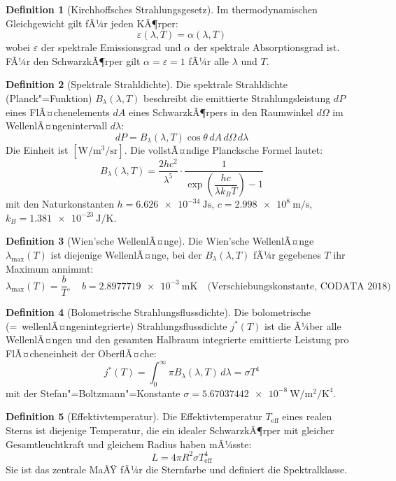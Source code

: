 ﻿\documentclass[a4paper,12pt]{article}
\theoremstyle{definition}
\newtheorem{definition}{Definition}
\begin{document}
\begin{definition}[Kirchhoffsches Strahlungsgesetz]
    Im thermodynamischen Gleichgewicht gilt fÃ¼r jeden KÃ¶rper:
    \[
        \varepsilon(\lambda, T) = \alpha(\lambda, T)
    \]
    wobei $\varepsilon$ der spektrale Emissionsgrad und $\alpha$ der spektrale
    Absorptionsgrad ist. FÃ¼r den SchwarzkÃ¶rper gilt $\alpha = \varepsilon = 1$
    fÃ¼r alle $\lambda$ und $T$.
\end{definition}

\begin{definition}[Spektrale Strahldichte]
    Die spektrale Strahldichte (Planck"=Funktion) $B_\lambda(\lambda, T)$ beschreibt
    die emittierte Strahlungsleistung $dP$ eines FlÃ¤chenelements $dA$ eines
    SchwarzkÃ¶rpers in den Raumwinkel $d\Omega$ im WellenlÃ¤ngenintervall $d\lambda$:
    \[
        dP = B_\lambda(\lambda, T) \cos\theta \, dA \, d\Omega \, d\lambda
    \]
    Die Einheit ist $[\si{\watt\per\metre\cubed\per\steradian}]$. Die vollstÃ¤ndige
    Plancksche Formel lautet:
    \[
        B_\lambda(\lambda, T) = \frac{2hc^2}{\lambda^5} \cdot
        \frac{1}{\exp\!\left(\dfrac{hc}{\lambda k_B T}\right) - 1}
    \]
    mit den Naturkonstanten $h = \SI{6.626e-34}{\joule\second}$,
    $c = \SI{2.998e8}{\metre\per\second}$, $k_B = \SI{1.381e-23}{\joule\per\kelvin}$.
\end{definition}

\begin{definition}[Wien'sche WellenlÃ¤nge]
    Die Wien'sche WellenlÃ¤nge $\lambda_{\max}(T)$ ist diejenige WellenlÃ¤nge,
    bei der $B_\lambda(\lambda,T)$ fÃ¼r gegebenes $T$ ihr Maximum annimmt:
    \[
        \lambda_{\max}(T) = \frac{b}{T}, \quad
        b = \SI{2.8977719e-3}{\metre\kelvin}
        \quad \text{(Verschiebungskonstante, CODATA 2018)}
    \]
\end{definition}

\begin{definition}[Bolometrische Strahlungsflussdichte]
    Die bolometrische (=\ wellenlÃ¤ngenintegrierte) Strahlungsflussdichte $j^*(T)$
    ist die Ã¼ber alle WellenlÃ¤ngen und den gesamten Halbraum integrierte emittierte
    Leistung pro FlÃ¤cheneinheit der OberflÃ¤che:
    \[
        j^*(T) = \int_0^\infty \pi B_\lambda(\lambda, T) \, d\lambda = \sigma T^4
    \]
    mit der Stefan"=Boltzmann"=Konstante
    $\sigma = \SI{5.67037442e-8}{\watt\per\metre\squared\per\kelvin\tothe{4}}$.
\end{definition}

\begin{definition}[Effektivtemperatur]
    Die Effektivtemperatur $T_{\text{eff}}$ eines realen Sterns ist diejenige Temperatur,
    die ein idealer SchwarzkÃ¶rper mit gleicher Gesamtleuchtkraft und gleichem Radius
    haben mÃ¼sste:
    \[
        L = 4\pi R^2 \sigma T_{\text{eff}}^4
    \]
    Sie ist das zentrale MaÃŸ fÃ¼r die Sternfarbe und definiert die Spektralklasse.
\end{definition}
\end{document}

